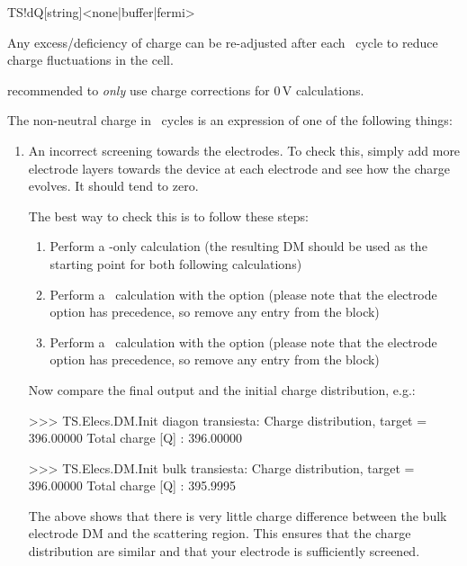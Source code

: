 \begin{fdfentry}{TS!dQ}[string]<none|buffer|fermi>

  Any excess/deficiency of charge can be re-adjusted after each
  \tsiesta\ cycle to reduce charge fluctuations in the cell.

  \note recommended to \emph{only} use charge corrections for
  $0\,\mathrm{V}$ calculations.

  The non-neutral charge in \tsiesta\ cycles is an expression of one
  of the following things:
  \begin{enumerate}
    \item An incorrect screening towards the electrodes. To check
    this, simply add more electrode layers towards the device at each
    electrode and see how the charge evolves. It should tend to zero.

    The best way to check this is to follow these steps:
    \begin{enumerate}
      \item%
      Perform a \siesta-only calculation (the resulting DM
      should be used as the starting point for both following
      calculations)

      \item%
      Perform a \tsiesta\ calculation with the option
       (please note that the electrode
      option has precedence, so remove any entry from the
       block)

      \item%
      Perform a \tsiesta\ calculation with the option
       (please note that the electrode
      option has precedence, so remove any entry from the
       block)

    \end{enumerate}

    Now compare the final output and the initial charge distribution,
    e.g.:
    \begin{output}
>>> TS.Elecs.DM.Init diagon
transiesta: Charge distribution, target =    396.00000
Total charge                  [Q]  :   396.00000

>>> TS.Elecs.DM.Init bulk
transiesta: Charge distribution, target =    396.00000
Total charge                  [Q]  :   395.9995
\end{output}

    The above shows that there is very little charge difference
    between the bulk electrode DM and the scattering region. This
    ensures that the charge distribution are similar and that your
    electrode is sufficiently screened.


\end{enumerate}
\end{fdfentry}
